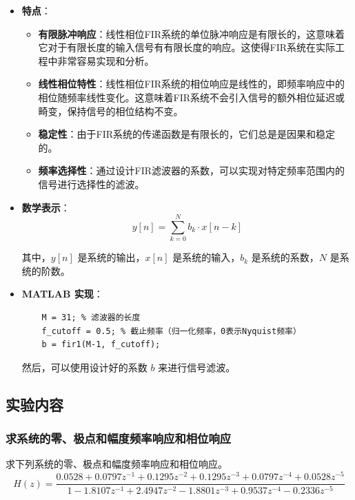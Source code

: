 \documentclass[a4paper,12pt]{article}
\begin{document}
\begin{itemize}
    \item \textbf{特点}：
    \begin{itemize}
        \item \textbf{有限脉冲响应}：线性相位FIR系统的单位脉冲响应是有限长的，这意味着它对于有限长度的输入信号有有限长度的响应。这使得FIR系统在实际工程中非常容易实现和分析。
        
        \item \textbf{线性相位特性}：线性相位FIR系统的相位响应是线性的，即频率响应中的相位随频率线性变化。这意味着FIR系统不会引入信号的额外相位延迟或畸变，保持信号的相位结构不变。
        
        \item \textbf{稳定性}：由于FIR系统的传递函数是有限长的，它们总是是因果和稳定的。
        
        \item \textbf{频率选择性}：通过设计FIR滤波器的系数，可以实现对特定频率范围内的信号进行选择性的滤波。
    \end{itemize}
    
    \item \textbf{数学表示}：
    \begin{equation}
    y[n] = \sum_{k=0}^{N} b_k \cdot x[n-k]
    \end{equation}

    其中，\( y[n] \) 是系统的输出，\( x[n] \) 是系统的输入，\( b_k \) 是系统的系数，\( N \) 是系统的阶数。
    
    \item \textbf{MATLAB 实现}：
    \begin{lstlisting}
    M = 31; % 滤波器的长度
    f_cutoff = 0.5; % 截止频率（归一化频率，0表示Nyquist频率）
    b = fir1(M-1, f_cutoff);
    \end{lstlisting}
    
    然后，可以使用设计好的系数 \( b \) 来进行信号滤波。
\end{itemize}


\subsection{实验内容}
\subsubsection{求系统的零、极点和幅度频率响应和相位响应}
求下列系统的零、极点和幅度频率响应和相位响应。
\[ H(z) = \frac{0.0528 + 0.0797z^{-1} + 0.1295z^{-2} + 0.1295z^{-3} + 0.0797z^{-4} + 0.0528z^{-5}}{1 - 1.8107z^{-1} + 2.4947z^{-2} - 1.8801z^{-3} + 0.9537z^{-4} - 0.2336z^{-5}} \]
\end{document}
